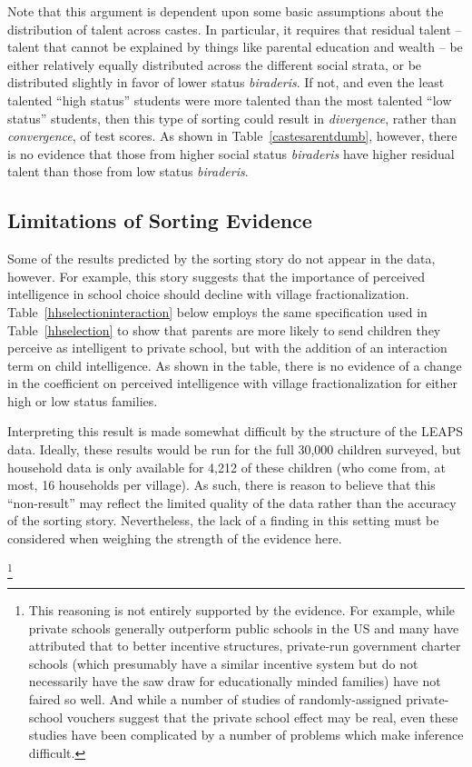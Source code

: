 Note that this argument is dependent upon some basic assumptions about the distribution of talent across castes. In particular, it requires that residual talent -- talent that cannot be explained by things like parental education and wealth -- be either relatively equally distributed across the different social strata, or be distributed slightly in favor of lower status \emph{biraderis}. If not, and even the least talented ``high status'' students were more talented than the most talented ``low status'' students, then this type of sorting could result in \emph{divergence}, rather than \emph{convergence}, of test scores. As shown in Table~\ref{castesarentdumb}, however, there is no evidence that those from higher social status \emph{biraderis} have higher residual talent than those from low status \emph{biraderis}.




\subsection{Limitations of Sorting Evidence}\label{}

Some of the results predicted by the sorting story do not appear in the data, however. For example, this story suggests that the importance of perceived intelligence in school choice should decline with village fractionalization. Table~\ref{hhselectioninteraction} below employs the same specification used in Table~\ref{hhselection} to show that parents are more likely to send children they perceive as intelligent to private school, but with the addition of an interaction term on child intelligence. As shown in the table, there is no evidence of a change in the coefficient on perceived intelligence with village fractionalization for either high or low status families.

Interpreting this result is made somewhat difficult by the structure of the LEAPS data. Ideally, these results would be run for the full 30,000 children surveyed, but household data is only available for 4,212 of these children (who come from, at most, 16 households per village). As such, there is reason to believe that this ``non-result'' may reflect the limited quality of the data rather than the accuracy of the sorting story. Nevertheless, the lack of a finding in this setting must be considered when weighing the strength of the evidence here. 






\footnote{This reasoning is not entirely supported by the evidence. For example, while private schools generally outperform public schools in the US and many have attributed that to better incentive structures, private-run government charter schools (which presumably have a similar incentive system but do not necessarily have the saw draw for educationally minded families) have not faired so well.\citep{Fuller:2002td} And while a number of studies of randomly-assigned private-school vouchers suggest that the private school effect may be real, even these studies have been complicated by a number of problems which make inference difficult.} 



